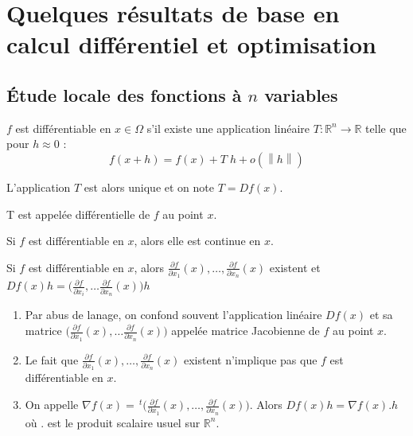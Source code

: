 \documentclass[a4paper,11pt]{article}
\newcommand{\R}{\mathbb{R}}
\newcommand{\norm}[1]{\left\lVert#1\right\rVert}
\newcommand{\tpo}[1]{\,^t#1}
\newcommand{\derpart}[2]{\displaystyle\frac{\partial#1}{\partial #2}}
\theoremstyle{plain} %
\begin{document}
\section{Quelques résultats de base en calcul différentiel et optimisation}

\subsection{Étude locale des fonctions à $n$ variables}

\begin{fdef}
    $f$ est différentiable en $x \in \Omega$ s'il existe une application linéaire 
    $T : \R^n \longrightarrow \R$ telle que pour $h \approx 0$ :
    \[
        f(x+h) = f(x) + T \; h + o(\norm{h})
    \]

    L'application $T$ est alors unique et on note $T = Df(x)$.

    T est appelée différentielle de $f$ au point $x$.
\end{fdef}

\begin{remark}
    Si $f$ est différentiable en $x$, alors elle est continue en $x$.
\end{remark}

\begin{lemme}
    Si $f$ est différentiable en $x$, alors $\displaystyle \frac{\partial f}{\partial x_1}(x), \dots , \displaystyle \frac{\partial f}{\partial x_n}(x)$ existent et
    $Df(x)h = \Big( \derpart{f}{x_i}, \dots \derpart{f}{x_n}(x) \Big) h$
\end{lemme}

\begin{remark}
    \begin{enumerate}
        \item Par abus de lanage, on confond souvent l'application linéaire $Df(x)$ et sa
            matrice $\Big( \derpart{f}{x_1}(x), \dots \derpart{f}{x_n}(x) \Big)$ appelée
            matrice Jacobienne de $f$ au point $x$.

        \item Le fait que $\derpart{f}{x_1} (x), \dots, \derpart{f}{x_n}(x)$ existent
            n'implique pas que $f$ est différentiable en $x$.

        \item On appelle $\nabla f(x) = \tpo{\Big( \derpart{f}{x_1}(x), \dots, \derpart{f}{x_n}(x) \Big)}$. Alors $Df(x)h = \nabla f(x) . h$ où $.$ est le produit scalaire usuel sur
            $\R^n$.
    \end{enumerate}
\end{remark}
\end{document}
